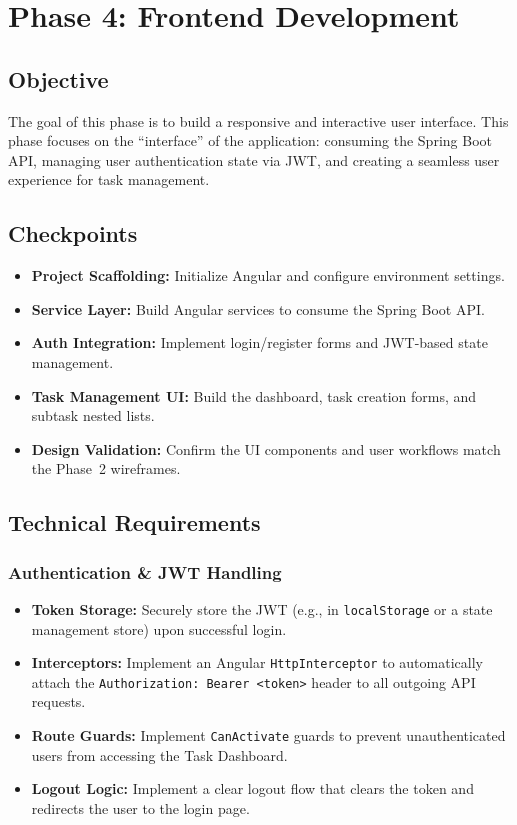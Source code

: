 \newpage
\section{Phase 4: Frontend Development}\label{sec:phase4}

\subsection{Objective}
The goal of this phase is to build a responsive and interactive user interface. This phase focuses on
the ``interface'' of the application: consuming the Spring Boot API, managing user authentication
state via JWT, and creating a seamless user experience for task management.

\subsection{Checkpoints}
\begin{itemize}
  \item[$\square$] \textbf{Project Scaffolding:} Initialize Angular and configure environment settings.
  \item[$\square$] \textbf{Service Layer:} Build Angular services to consume the Spring Boot API.
  \item[$\square$] \textbf{Auth Integration:} Implement login/register forms and JWT-based state management.
  \item[$\square$] \textbf{Task Management UI:} Build the dashboard, task creation forms, and subtask nested lists.
  \item[$\square$] \textbf{Design Validation:} Confirm the UI components and user workflows match the Phase~2 wireframes.
\end{itemize}

\subsection{Technical Requirements}

\subsubsection{Authentication \& JWT Handling}
\begin{itemize}
  \item \textbf{Token Storage:} Securely store the JWT (e.g., in \texttt{localStorage} or a state management store) upon successful login.
  \item \textbf{Interceptors:} Implement an Angular \texttt{HttpInterceptor} to automatically attach the \texttt{Authorization: Bearer <token>} header to all outgoing API requests.
  \item \textbf{Route Guards:} Implement \texttt{CanActivate} guards to prevent unauthenticated users from accessing the Task Dashboard.
  \item \textbf{Logout Logic:} Implement a clear logout flow that clears the token and redirects the user to the login page.
\end{itemize}

